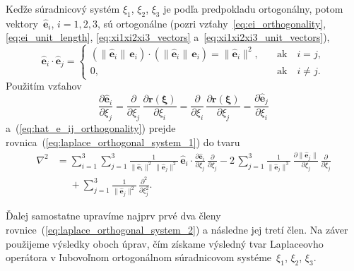 \documentclass[a4paper,12pt]{book}
\let\vec\mathbf
\begin{document}
Keďže súradnicový systém $\xi_1$, $\xi_2$, $\xi_3$ je podľa predpokladu 
ortogonálny, potom vektory~$\hat{\vec e}_i$, $i = 1, 2, 3$, sú ortogonálne 
(pozri vzťahy~\ref{eq:ei_orthogonality}, \ref{eq:ei_unit_length}, 
\ref{eq:xi1xi2xi3_vectors} a~\ref{eq:xi1xi2xi3_unit_vectors}),
%
\begin{equation}
\label{eq:hat_e_ij_orthogonality}
\hat{\vec e}_i \cdot \hat{\vec e}_j =
%
\begin{cases}
\left( \| \hat{\vec e}_i \| \, \vec e_i \right) \cdot \left( \| \hat{\vec e}_i 
\| \, \vec e_i \right) = \| \hat{\vec e}_i \|^2{,} \quad &\textrm{ak} \quad 
i = j{,}\\
0{,} \quad &\textrm{ak} \quad i \neq j{.}
\end{cases}
\end{equation}
%
Použitím vzťahov
%
\begin{equation}
\label{eq:partials_hat_e}
\frac{\partial \hat{\vec e}_i}{\partial \xi_j} = \frac{\partial}{\partial 
\xi_j} \, \frac{\partial \vec r(\boldsymbol \xi)}{\partial \xi_i} 
= \frac{\partial}{\partial \xi_i} \, \frac{\partial \vec r(\boldsymbol 
\xi)}{\partial \xi_j} = \frac{\partial \hat{\vec e}_j}{\partial \xi_i}
\end{equation}
%
a~(\ref{eq:hat_e_ij_orthogonality}) prejde 
rovnica~(\ref{eq:laplace_orthogonal_system_1}) do tvaru
%
\begin{equation}
\label{eq:laplace_orthogonal_system_2}
\begin{split}
\nabla^2 &= \sum_{i = 1}^{3} \sum_{j = 1}^3 \frac{1}{\| \hat{\vec e}_i \|^2 \, 
\| \hat{\vec e}_j \|^2} \, \hat{\vec e}_i \cdot \frac{\partial \hat{\vec 
e}_i}{\partial \xi_j} \, \frac{\partial}{\partial \xi_j}
- 2\, \sum_{j = 1}^{3} \frac{1}{\|\hat{\vec e}_j \|^3} \, \frac{\partial \| 
\hat{\vec e}_j \|}{\partial \xi_j} \, \frac{\partial}{\partial \xi_j}\\
%
&\phantom{={}}+ \sum_{j = 1}^3 \frac{1}{\| \hat{\vec e}_j \|^2} \, 
\frac{\partial^2}{\partial \xi_j^2}{.}
\end{split}
%
\end{equation}

Ďalej samostatne upravíme najprv prvé dva členy 
rovnice~(\ref{eq:laplace_orthogonal_system_2}) a následne jej tretí člen.  Na 
záver použijeme výsledky oboch úprav, čím získame výsledný tvar Laplaceovho 
operátora v ľubovoľnom ortogonálnom súradnicovom systéme~$\xi_1$, $\xi_2$, 
$\xi_3$.
\end{document}
